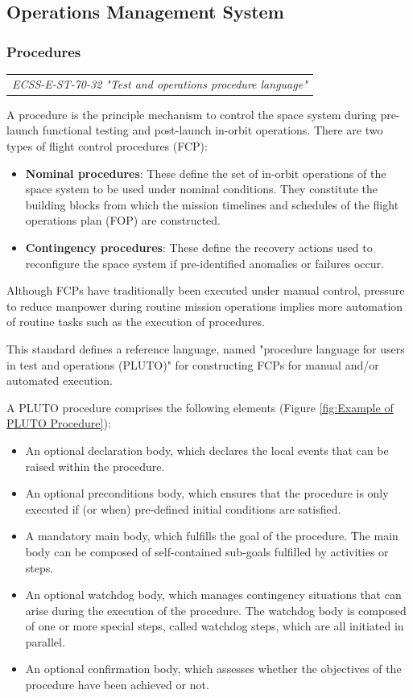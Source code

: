 \subsection{Operations Management System}

\subsubsection{Procedures}

\begin{tabular}{l}
\textit{ECSS-E-ST-70-32 "Test and operations procedure language" \cite{ECSS-E-ST-70-32}} \\
\end{tabular}

A procedure is the principle mechanism to control the space system during pre-launch functional testing and post-launch in-orbit operations. There are two types of flight control procedures (FCP):

\begin{itemize}
\item \textbf{Nominal procedures}: These define the set of in-orbit operations of the space system to be used under nominal conditions. They constitute the building blocks from which the mission timelines and schedules of the flight operations plan (FOP) are constructed. 
\item \textbf{Contingency procedures}: These define the recovery actions used to reconfigure the space system if pre-identified anomalies or failures occur.
\end{itemize}

Although FCPs have traditionally been executed under manual control, pressure to reduce manpower during routine mission operations implies more automation of routine tasks such as the execution of procedures.

This standard defines a reference language, named "procedure language for users in test and operations (PLUTO)" for constructing FCPs for manual and/or automated execution.

A PLUTO procedure comprises the following elements (Figure \ref{fig:Example of PLUTO Procedure}):

\begin{itemize}
\item An optional declaration body, which declares the local events that can be raised within the procedure. 
\item An optional preconditions body, which ensures that the procedure is only executed if (or when) pre-defined initial conditions are satisfied.
\item A mandatory main body, which fulfills the goal of the procedure. The main body can be composed of self-contained sub-goals fulfilled by activities or steps.
\item An optional watchdog body, which manages contingency situations that can arise during the execution of the procedure. The watchdog body is composed of one or more special steps, called watchdog steps, which are all initiated in parallel.
\item An optional confirmation body, which assesses whether the objectives of the procedure have been achieved or not. 
\end{itemize}

